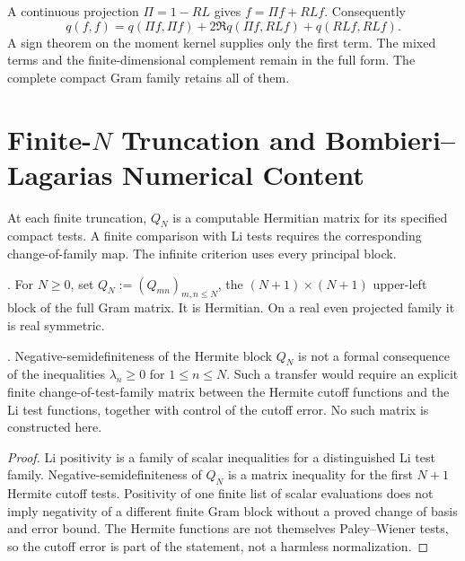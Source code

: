 \begin{remark}
\label{v4-arith:w7-h:rem:tautology}
A continuous projection $\Pi=1-RL$ gives
$f=\Pi f+RLf$. Consequently
\[
 q(f,f)=q(\Pi f,\Pi f)+2\Re q(\Pi f,RLf)+q(RLf,RLf).
\]
A sign theorem on the moment kernel supplies only the first term.
The mixed terms and the finite-dimensional complement remain in the
full form. The complete compact Gram family retains all of them.
\end{remark}

\section{Finite-\(N\) Truncation and Bombieri--Lagarias Numerical Content}
\label{v4-arith:w7-h:finite-N}

At each finite truncation, $Q_N$ is a computable Hermitian matrix
for its specified compact tests. A finite comparison with Li tests
requires the corresponding change-of-family map. The infinite criterion
uses every principal block.

\begin{definition}
\label{v4-arith:w7-h:def:truncated}
\ClaimStatusDefinitional. For \(N\geq 0\), set
\(Q_{N}:=(Q_{mn})_{m,n\leq N}\), the \((N+1)\times(N+1)\) upper-left
block of the full Gram matrix. It is Hermitian. On a real even
projected family it is real symmetric.
\end{definition}

\begin{theorem}
\label{v4-arith:w7-h:thm:finite-N-li}
\ClaimStatusProvedHere. Negative-semidefiniteness of the Hermite block
\(Q_{N}\) is not a formal consequence of the inequalities
\(\lambda_{n}\geq0\) for \(1\leq n\leq N\). Such a transfer would require
an explicit finite change-of-test-family matrix between the
Hermite cutoff functions and the Li test functions, together with
control of the cutoff error. No such matrix is constructed here.
\end{theorem}

\begin{proof}
Li positivity is a family of scalar inequalities for a distinguished
Li test family. Negative-semidefiniteness of \(Q_{N}\) is a matrix
inequality for the first \(N+1\) Hermite cutoff tests. Positivity of
one finite list of scalar evaluations does not imply negativity of a
different finite Gram block without a proved change of basis and error
bound. The Hermite functions are not themselves Paley--Wiener tests,
so the cutoff error is part of the statement, not a harmless
normalization.
\end{proof}


